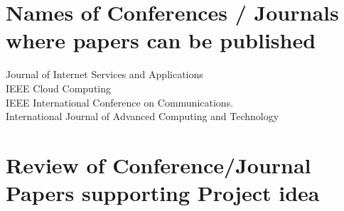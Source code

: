 \documentclass[oneside,a4paper,12pt]{report}
\begin{document}
\section{Names of Conferences / Journals where papers can be published}

Journal of Internet Services and Applications\\
IEEE Cloud Computing\\
IEEE International Conference on Communications.\\
International Journal of Advanced Computing and Technology\\


\section{Review of Conference/Journal Papers supporting Project idea}
\label{sec:survey}
\end{document}
